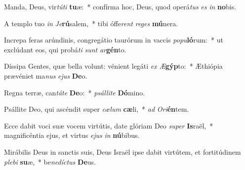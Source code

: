 \item Manda, Deus, vir\textit{tú}\textit{ti} \textbf{tu}æ:~* confírma hoc, Deus, quod operá\textit{tus} \textit{es} \textit{in} \textbf{no}bis.
\item A templo tuo \textit{in} \textit{Je}\textbf{rú}salem,~* tibi óffe\textit{rent} \textit{re}\textit{ges} \textbf{mú}nera.
\item Increpa feras arúndinis, congregátio taurórum in vaccis \textit{po}\textit{pu}\textbf{ló}rum:~* ut exclúdant eos, qui probá\textit{ti} \textit{sunt} \textit{ar}\textbf{gén}to.
\item Díssipa Gentes, quæ bella volunt: vénient legáti \textit{ex} \textit{Æ}\textbf{gýp}to:~* Æthiópia prævéniet ma\textit{nus} \textit{e}\textit{jus} \textbf{De}o.
\item Regna terræ, can\textit{tá}\textit{te} \textbf{De}o:~* \textit{psál}\textit{li}\textit{te} \textbf{Dó}mino.
\item Psállite Deo, qui ascéndit super \textit{cæ}\textit{lum} \textbf{cæ}li,~* \textit{ad} \textit{O}\textit{ri}\textbf{én}tem.
\item Ecce dabit voci suæ vocem virtútis, date glóriam Deo \textit{su}\textit{per} \textbf{Is}raël,~* magnificéntia ejus, et virtus \textit{e}\textit{jus} \textit{in} \textbf{nú}bibus.
\item Mirábilis Deus in sanctis suis, Deus Israël ipse dabit virtútem, et fortitúdinem \textit{ple}\textit{bi} \textbf{su}æ,~* be\textit{ne}\textit{díc}\textit{tus} \textbf{De}us.
